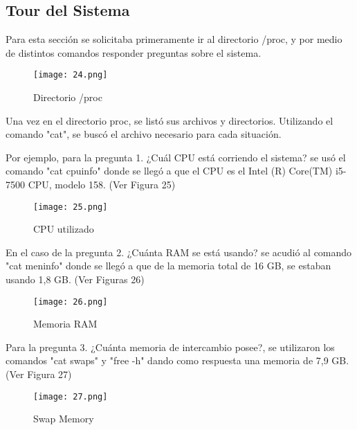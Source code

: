 \documentclass[
  letterpaper, 
  maincolor=black,
  sectioncolor=black!90,
  subsectioncolor=black!70,
  itemtextcolor=black!40,
]{fortysecondscv}
\begin{document}
\subsection{Tour del Sistema}
{Para esta sección se solicitaba primeramente ir al directorio /proc, y por medio de distintos comandos responder preguntas sobre el sistema.}

\begin{center}
    \begin{figure}[H]
    \centering
    \texttt{[image: 24.png]}
    \caption{Directorio /proc}
    \label{fig:10.png}
    \end{figure}
\end{center}

{Una vez en el directorio proc, se listó sus archivos y directorios. Utilizando el comando "cat", se buscó el archivo necesario para cada situación.}

{Por ejemplo, para la pregunta 1. ¿Cuál CPU está corriendo el sistema? se usó el comando "cat cpuinfo" donde se llegó a que el CPU es el Intel (R) Core(TM) i5-7500 CPU, modelo 158. (Ver Figura 25)}

\begin{center}
    \begin{figure}[H]
    \centering
    \texttt{[image: 25.png]}
    \caption{CPU utilizado}
    \label{fig:10.png}
    \end{figure}
\end{center}

{En el caso de la pregunta 2. ¿Cuánta RAM se está usando? se acudió al comando "cat meninfo" donde se llegó a que de la memoria total de 16 GB, se estaban usando 1,8 GB. (Ver Figuras 26)}

\begin{center}
    \begin{figure}[H]
    \centering
    \texttt{[image: 26.png]}
    \caption{Memoria RAM}
    \label{fig:10.png}
    \end{figure}
\end{center}

{Para la pregunta 3. ¿Cuánta memoria de intercambio posee?, se utilizaron los comandos "cat swaps" y "free -h" dando como respuesta una memoria de 7,9 GB. (Ver Figura 27)}

\begin{center}
    \begin{figure}[H]
    \centering
    \texttt{[image: 27.png]}
    \caption{Swap Memory}
    \label{fig:10.png}
    \end{figure}
\end{center}
\end{document}
